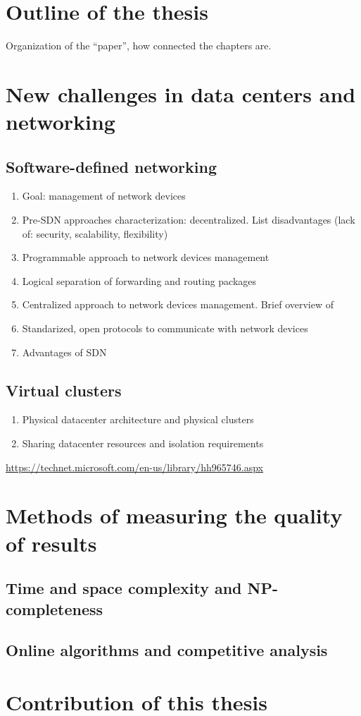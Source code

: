 \section{Outline of the thesis}


Organization of the ``paper'', how connected the chapters are.


\section{New challenges in data centers and networking}

\subsection{Software-defined networking}

\begin{enumerate}
  \item Goal: management of network devices
  \item Pre-SDN approaches characterization: decentralized. List disadvantages (lack of: security, scalability, flexibility)
  \item Programmable approach to network devices management
  \item Logical separation of forwarding and routing packages
  \item Centralized approach to network devices management. Brief overview of 
  \item Standarized, open protocols to communicate with network devices
  \item Advantages of SDN
\end{enumerate}


\subsection{Virtual clusters}

\begin{enumerate}
  \item Physical datacenter architecture and physical clusters
  \item Sharing datacenter resources and isolation requirements
\end{enumerate}

\url{https://technet.microsoft.com/en-us/library/hh965746.aspx}


\section{Methods of measuring the quality of results}

\subsection{Time and space complexity and NP-completeness}
\subsection{Online algorithms and competitive analysis}

\section{Contribution of this thesis}